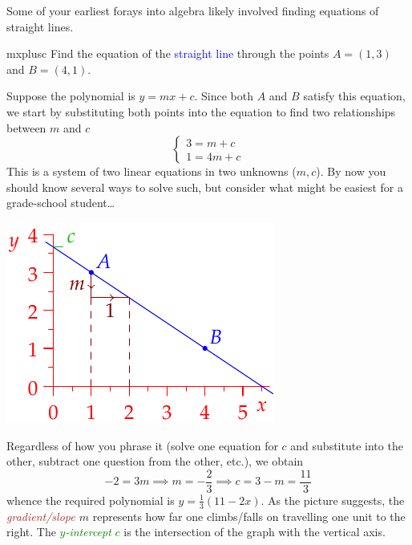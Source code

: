 Some of your earliest forays into algebra likely involved finding equations of straight lines.

\begin{example}{}{mxplusc}
	Find the equation of the \textcolor{blue}{straight line} through the points $A=(1,3)$ and $B=(4,1)$.
	\par
	\begin{minipage}[t]{0.64\linewidth}\vspace{-5pt}
		Suppose the polynomial is $y=mx+c$. Since both $A$ and $B$ satisfy this equation, we start by substituting both points into the equation to find two relationships between $m$ and $c$
		\[
			\begin{cases}
				3=m+c\\
				1=4m+c
			\end{cases}
		\]
		This is a system of two linear equations in two unknowns ($m,c$). By now you should know several ways to solve such, but consider what might be easiest for a grade-school student\ldots
	\end{minipage}
	\hfill
	\begin{minipage}[t]{0.35\linewidth}\vspace{0pt}
		\flushright\includegraphics{line-line}
	\end{minipage}
	\medbreak 
	Regardless of how you phrase it (solve one equation for $c$ and substitute into the other, subtract one question from the other, etc.), we obtain
	\[
		-2=3m\implies m=-\frac 23\implies c=3-m=\frac{11}3
	\]
	whence the required polynomial is $y=\frac 13(11-2x)$.\smallbreak
	As the picture suggests, the \emph{\textcolor{Brown}{gradient/slope} $m$} represents how far one climbs/falls on travelling one unit to the right.	The \textcolor{Green}{\emph{$y$-intercept} $c$} is the intersection of the graph with the vertical axis.
\end{example}

